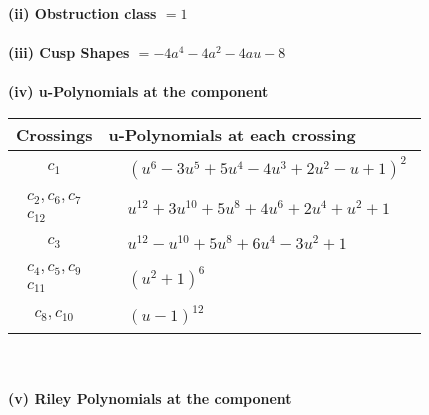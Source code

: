 \documentclass[1p]{elsarticle_modified}
\theoremstyle{definition}
\begin{document}
\flushleft \textbf{(ii) Obstruction class $= 1$}\\~\\
\flushleft \textbf{(iii) Cusp Shapes $= -4 a^4-4 a^2-4 a u-8$}\\~\\
\newpage\renewcommand{\arraystretch}{1}
\flushleft \textbf{(iv) u-Polynomials at the component}\newline \\
\begin{tabular}{m{50pt}|m{274pt}}
Crossings & \hspace{64pt}u-Polynomials at each crossing \\
\hline $$\begin{aligned}c_{1}\end{aligned}$$&$\begin{aligned}
&(u^6-3 u^5+5 u^4-4 u^3+2 u^2- u+1)^2
\end{aligned}$\\
\hline $$\begin{aligned}c_{2},c_{6},c_{7}\\c_{12}\end{aligned}$$&$\begin{aligned}
&u^{12}+3 u^{10}+5 u^8+4 u^6+2 u^4+u^2+1
\end{aligned}$\\
\hline $$\begin{aligned}c_{3}\end{aligned}$$&$\begin{aligned}
&u^{12}- u^{10}+5 u^8+6 u^4-3 u^2+1
\end{aligned}$\\
\hline $$\begin{aligned}c_{4},c_{5},c_{9}\\c_{11}\end{aligned}$$&$\begin{aligned}
&(u^2+1)^6
\end{aligned}$\\
\hline $$\begin{aligned}c_{8},c_{10}\end{aligned}$$&$\begin{aligned}
&(u-1)^{12}
\end{aligned}$\\
\hline
\end{tabular}\\~\\
\newpage\renewcommand{\arraystretch}{1}
\flushleft \textbf{(v) Riley Polynomials at the component}\newline \\
\end{document}
